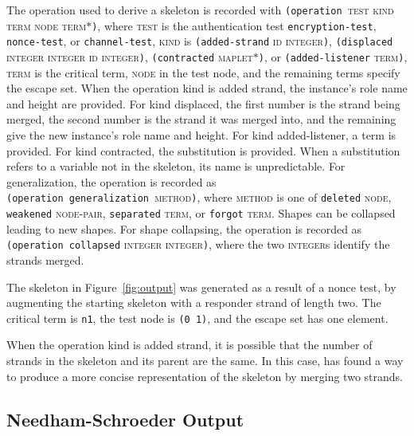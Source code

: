 \documentclass[12pt]{article}
\begin{document}
\label{sec:operation}
\begin{sloppypar}
The operation used to derive a skeleton is recorded with
\texttt{(operation~}\textsc{test kind term node
  term$\ast$}\texttt{)}, where \textsc{test} is the authentication
test \texttt{encryption-test}, \texttt{nonce-test}, or
\texttt{channel-test},
\textsc{kind} is
\texttt{(added-strand} \textsc{id} \textsc{integer}\texttt{)},
\texttt{(displaced} \textsc{integer} \textsc{integer} \textsc{id} \textsc{integer}\texttt{)},
\texttt{(contracted} \textsc{maplet$\ast$}\texttt{)}, or
\texttt{(added-listener} \textsc{term}\texttt{)}, \textsc{term} is the
critical term, \textsc{node} in the test node, and the remaining terms
specify the escape set. When the operation kind is added strand, the
instance's role name and height are provided.
For kind displaced, the first number is the strand being merged, the
second number is the strand it was merged into, and the remaining give
the new instance's role name and height.
For kind added-listener,
a term is provided. For kind contracted, the substitution is
provided. When a substitution refers to a variable not in the
skeleton, its name is unpredictable. For generalization, the operation
is recorded as
\texttt{(operation~generalization~}\textsc{method}\texttt{)}, where
\textsc{method} is one of \texttt{deleted} \textsc{node},
\texttt{weakened} \textsc{node-pair}, \texttt{separated}
\textsc{term}, or \texttt{forgot} \textsc{term}.  Shapes can be
collapsed leading to new shapes.  For shape collapsing, the operation
is recorded as \texttt{(operation~collapsed} \textsc{integer}
\textsc{integer}\texttt{)}, where the two \textsc{integer}s identify
the strands merged.
\end{sloppypar}

The skeleton in Figure~\ref{fig:output} was generated as a result of a
nonce test, by augmenting the starting skeleton with a responder
strand of length two.  The critical term is \texttt{n1}, the test
node is \texttt{(0~1)}, and the escape set has one element.

When the operation kind is added strand, it is possible that the
number of strands in the skeleton and its parent are the same.  In
this case, {\cpsa} has found a way to produce a more concise
representation of the skeleton by merging two strands.

\subsection{Needham-Schroeder Output}
\end{document}
